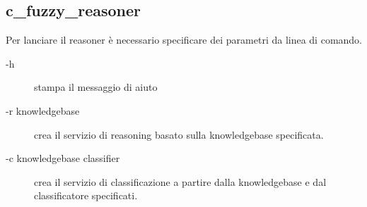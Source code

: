 \subsection{c\_fuzzy\_reasoner}

Per lanciare il reasoner è necessario specificare dei parametri da linea di comando.

\begin{description}
 \item [-h] stampa il messaggio di aiuto 
 \item [-r knowledgebase] crea il servizio di reasoning basato sulla knowledgebase specificata.  
 \item [-c knowledgebase classifier] crea il servizio di classificazione a partire dalla knowledgebase e dal classificatore specificati. 

\end{description}

